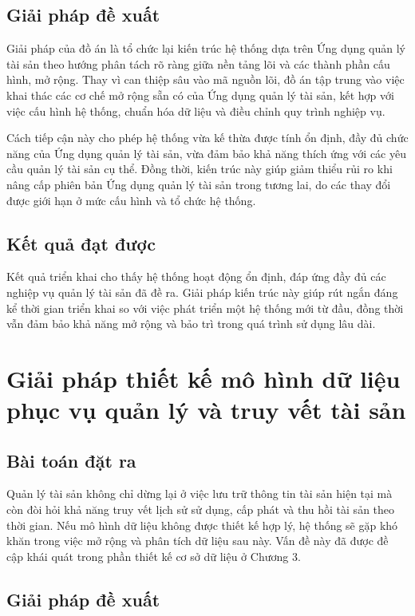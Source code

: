 \documentclass[../DoAn.tex]{subfiles}
\begin{document}
\subsection{Giải pháp đề xuất}

Giải pháp của đồ án là tổ chức lại kiến trúc hệ thống dựa trên Ứng dụng quản lý tài sản theo hướng phân tách rõ ràng giữa nền tảng lõi và các thành phần cấu hình, mở rộng. Thay vì can thiệp sâu vào mã nguồn lõi, đồ án tập trung vào việc khai thác các cơ chế mở rộng sẵn có của Ứng dụng quản lý tài sản, kết hợp với việc cấu hình hệ thống, chuẩn hóa dữ liệu và điều chỉnh quy trình nghiệp vụ.

Cách tiếp cận này cho phép hệ thống vừa kế thừa được tính ổn định, đầy đủ chức năng của Ứng dụng quản lý tài sản, vừa đảm bảo khả năng thích ứng với các yêu cầu quản lý tài sản cụ thể. Đồng thời, kiến trúc này giúp giảm thiểu rủi ro khi nâng cấp phiên bản Ứng dụng quản lý tài sản trong tương lai, do các thay đổi được giới hạn ở mức cấu hình và tổ chức hệ thống.

\subsection{Kết quả đạt được}

Kết quả triển khai cho thấy hệ thống hoạt động ổn định, đáp ứng đầy đủ các nghiệp vụ quản lý tài sản đã đề ra. Giải pháp kiến trúc này giúp rút ngắn đáng kể thời gian triển khai so với việc phát triển một hệ thống mới từ đầu, đồng thời vẫn đảm bảo khả năng mở rộng và bảo trì trong quá trình sử dụng lâu dài.

\section{Giải pháp thiết kế mô hình dữ liệu phục vụ quản lý và truy vết tài sản}

\subsection{Bài toán đặt ra}

Quản lý tài sản không chỉ dừng lại ở việc lưu trữ thông tin tài sản hiện tại mà còn đòi hỏi khả năng truy vết lịch sử sử dụng, cấp phát và thu hồi tài sản theo thời gian. Nếu mô hình dữ liệu không được thiết kế hợp lý, hệ thống sẽ gặp khó khăn trong việc mở rộng và phân tích dữ liệu sau này. Vấn đề này đã được đề cập khái quát trong phần thiết kế cơ sở dữ liệu ở Chương 3.

\subsection{Giải pháp đề xuất}
\end{document}
